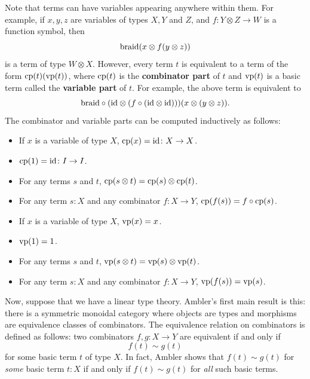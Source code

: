 \documentclass[12pt,twoside,openright]{report}
\newcommand{\maps}{\colon}
\newcommand{\tensor}{\otimes}
\newcommand{\Id}{{\rm id}}
\newcommand{\braid}{{\rm braid}}
\newcommand{\cp}{{\rm cp}}
\newcommand{\vp}{{\rm vp}}
\begin{document}
Note that terms can have variables appearing anywhere within them. For example, if $x,y,z$ are variables of types $X,Y$ and $Z$, and
$f\maps Y \tensor Z \to W$ is a function symbol, then
\[ \braid(x \tensor f(y \tensor z)) \]
is a term of type $W \tensor X$.  However, every term $t$ is equivalent to a term of the form $\cp(t)(\vp(t))$, where $\cp(t)$
is the {\bf combinator part} of $t$ and $\vp(t)$ is a basic term called the {\bf variable part} of $t$.  For example, the above term is equivalent to
\[ \braid \circ (\Id \tensor (f \circ (\Id \tensor \Id)))
(x \tensor (y \tensor z)). \]
The combinator and variable parts can be computed inductively as follows:
\begin{itemize}
  \item If $x$ is a variable of type $X$, $\cp(x) = \Id\maps X \to X$.
  \item $\cp(1) = \Id\maps I \to I$.
  \item For any terms $s$ and $t$, $\cp(s \tensor t) = \cp(s) \tensor \cp(t)$.
  \item For any term $s:X$ and any combinator $f : X \to Y$, 
$\cp(f(s)) = f \circ \cp(s)$. \\
  \item If $x$ is a variable of type $X$, $\vp(x) = x$.
  \item $\vp(1) = 1$.
  \item For any terms $s$ and $t$, $\vp(s \tensor t) = \vp(s) \tensor \vp(t)$.
  \item For any term $s:X$ and any combinator $f \maps X \to Y$, 
$\vp(f(s)) = \vp(s)$.
\end{itemize}

Now, suppose that we have a linear type theory.  Ambler's first main result is this: there is a symmetric monoidal category where objects are types and morphisms are equivalence classes of combinators.  The equivalence relation on combinators is defined as follows: two combinators $f, g \maps X \to Y$ are equivalent if and only if
\[                    f(t) \sim g(t)  \]
for some basic term $t$ of type $X$.  In fact, Ambler shows that
$f(t) \sim g(t)$ for {\it some} basic term $t:X$ if and only if 
$f(t) \sim g(t)$ for {\it all} such basic terms.
\end{document}
